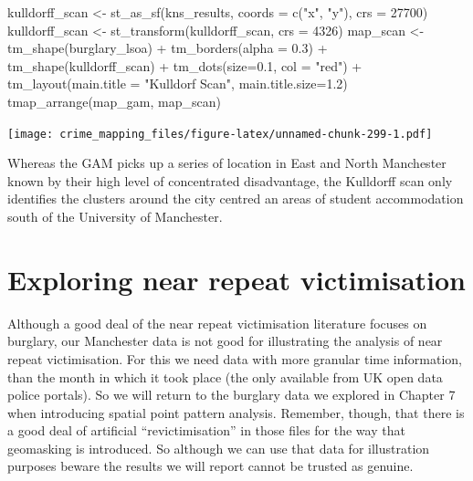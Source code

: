 \documentclass[
  krantz2]{krantz}
\makeatletter
\newenvironment{Shaded}{\begin{snugshade}}{\end{snugshade}}
\newcommand{\AttributeTok}[1]{\textcolor[rgb]{0.61,0.61,0.61}{#1}}
\newcommand{\DecValTok}[1]{\textcolor[rgb]{0.06,0.06,0.06}{#1}}
\newcommand{\FloatTok}[1]{\textcolor[rgb]{0.06,0.06,0.06}{#1}}
\newcommand{\FunctionTok}[1]{\textcolor[rgb]{0,0,0}{#1}}
\newcommand{\NormalTok}[1]{#1}
\newcommand{\OtherTok}[1]{\textcolor[rgb]{0.37,0.37,0.37}{#1}}
\newcommand{\SpecialCharTok}[1]{\textcolor[rgb]{0,0,0}{#1}}
\newcommand{\StringTok}[1]{\textcolor[rgb]{0.5,0.5,0.5}{#1}}
\newenvironment{kframe}{%
\medskip{}
\setlength{\fboxsep}{.8em}
 \def\at@end@of@kframe{}%
 \ifinner\ifhmode%
  \def\at@end@of@kframe{\end{minipage}}%
  \begin{minipage}{\columnwidth}%
 \fi\fi%
 \def\FrameCommand##1{\hskip\@totalleftmargin \hskip-\fboxsep
 \colorbox{shadecolor}{##1}\hskip-\fboxsep
     \hskip-\linewidth \hskip-\@totalleftmargin \hskip\columnwidth}%
 \MakeFramed {\advance\hsize-\width
   \@totalleftmargin\z@ \linewidth\hsize
   \@setminipage}}%
 {\par\unskip\endMakeFramed%
 \at@end@of@kframe}
\renewenvironment{Shaded}{\begin{kframe}}{\end{kframe}}
\makeatother
\begin{document}
\begin{Shaded}
\begin{Highlighting}[]
\NormalTok{kulldorff\_scan }\OtherTok{\textless{}{-}} \FunctionTok{st\_as\_sf}\NormalTok{(kns\_results, }
                      \AttributeTok{coords =} \FunctionTok{c}\NormalTok{(}\StringTok{"x"}\NormalTok{, }\StringTok{"y"}\NormalTok{),}
                      \AttributeTok{crs =} \DecValTok{27700}\NormalTok{)}
\NormalTok{kulldorff\_scan }\OtherTok{\textless{}{-}} \FunctionTok{st\_transform}\NormalTok{(kulldorff\_scan, }\AttributeTok{crs =} \DecValTok{4326}\NormalTok{)}
\NormalTok{map\_scan }\OtherTok{\textless{}{-}} \FunctionTok{tm\_shape}\NormalTok{(burglary\_lsoa) }\SpecialCharTok{+} \FunctionTok{tm\_borders}\NormalTok{(}\AttributeTok{alpha =} \FloatTok{0.3}\NormalTok{) }\SpecialCharTok{+}
  \FunctionTok{tm\_shape}\NormalTok{(kulldorff\_scan) }\SpecialCharTok{+} \FunctionTok{tm\_dots}\NormalTok{(}\AttributeTok{size=}\FloatTok{0.1}\NormalTok{, }\AttributeTok{col =} \StringTok{"red"}\NormalTok{) }\SpecialCharTok{+}
  \FunctionTok{tm\_layout}\NormalTok{(}\AttributeTok{main.title =} \StringTok{"Kulldorf Scan"}\NormalTok{, }\AttributeTok{main.title.size=}\FloatTok{1.2}\NormalTok{)}
\FunctionTok{tmap\_arrange}\NormalTok{(map\_gam, map\_scan)}
\end{Highlighting}
\end{Shaded}

\texttt{[image: crime\_mapping\_files/figure-latex/unnamed-chunk-299-1.pdf]}

Whereas the GAM picks up a series of location in East and North Manchester known by their high level of concentrated disadvantage, the Kulldorff scan only identifies the clusters around the city centred an areas of student accommodation south of the University of Manchester.

\hypertarget{exploring-near-repeat-victimisation}{%
\section{Exploring near repeat victimisation}\label{exploring-near-repeat-victimisation}}

Although a good deal of the near repeat victimisation literature focuses on burglary, our Manchester data is not good for illustrating the analysis of near repeat victimisation. For this we need data with more granular time information, than the month in which it took place (the only available from UK open data police portals). So we will return to the burglary data we explored in Chapter 7 when introducing spatial point pattern analysis. Remember, though, that there is a good deal of artificial ``revictimisation'' in those files for the way that geomasking is introduced. So although we can use that data for illustration purposes beware the results we will report cannot be trusted as genuine.
\end{document}
